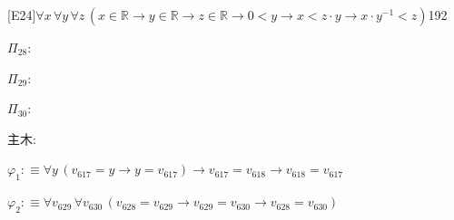 \begin{fullproof}{[E24]}{$\forall x\,\forall y\,\forall z\,(x \in \mathbb{R} \to y \in \mathbb{R} \to z \in \mathbb{R} \to 0 < y \to x < z \cdot y \to x \cdot y^{-1} < z)$}{192}
\begin{ptree}
\end{ptree}
\noindent$\Pi_{28}$:
\begin{ptree}
\noLine
{}
\noLine
{}
\end{ptree}
\noindent$\Pi_{29}$:
\begin{ptree}
\noLine
{}
\noLine
{}
\end{ptree}
\noindent$\Pi_{30}$:
\begin{ptree}
\noLine
{}
\noLine
{}
\noLine
{}
\end{ptree}
\noindent 主木:
\begin{ptree}
\noLine
{}
\noLine
{}
\end{ptree}
\begin{abbrevlist}
\item $\varphi_{1} :\equiv \forall y\,(v_{617} = y \to y = v_{617}) \to v_{617} = v_{618} \to v_{618} = v_{617}$
\item $\varphi_{2} :\equiv \forall v_{629}\,\forall v_{630}\,(v_{628} = v_{629} \to v_{629} = v_{630} \to v_{628} = v_{630})$

\end{abbrevlist}
\end{fullproof}

